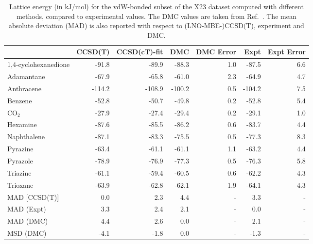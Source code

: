 \begin{table}[h]

\caption{\label{tab:x23_vdw_bonded_compare}Lattice energy (in kJ/mol) for the vdW-bonded subset of the X23 dataset computed with different methods, compared to experimental values. The DMC values are taken from Ref.~. The mean absolute deviation (MAD) is also reported with respect to (LNO-MBE-)CCSD(T), experiment and DMC.}
\begin{tabular}{lrrrrrr}
\toprule
 & CCSD(T) & CCSD(cT)-fit & DMC & DMC Error & Expt & Expt Error \\ 
\midrule
1,4-cyclohexanedione & -91.8 & -89.9 & -88.3 & 1.0 & -87.5 & 6.6 \\
Adamantane & -67.9 & -65.8 & -61.0 & 2.3 & -64.9 & 4.7 \\
Anthracene & -114.2 & -108.9 & -100.2 & 0.5 & -104.2 & 7.5 \\
Benzene & -52.8 & -50.7 & -49.8 & 0.2 & -52.8 & 5.4 \\
CO$_2$ & -27.9 & -27.4 & -29.4 & 0.2 & -29.1 & 1.0 \\
Hexamine & -87.6 & -85.5 & -86.2 & 0.6 & -83.7 & 4.4 \\
Naphthalene & -87.1 & -83.3 & -75.5 & 0.5 & -77.3 & 8.3 \\
Pyrazine & -63.4 & -61.1 & -61.1 & 1.1 & -63.2 & 4.4 \\
Pyrazole & -78.9 & -76.9 & -77.3 & 0.5 & -76.3 & 5.8 \\
Triazine & -61.1 & -59.4 & -60.5 & 0.6 & -62.2 & 4.3 \\
Trioxane & -63.9 & -62.8 & -62.1 & 1.9 & -64.1 & 4.3 \\
MAD [CCSD(T)] & 0.0 & 2.3 & 4.4 & - & 3.3 & - \\
MAD (Expt) & 3.3 & 2.4 & 2.1 & - & 0.0 & - \\
MAD (DMC) & 4.4 & 2.6 & 0.0 & - & 2.1 & - \\
MSD (DMC) & -4.1 & -1.8 & 0.0 & - & -1.3 & - \\
\bottomrule
\end{tabular}

\end{table}